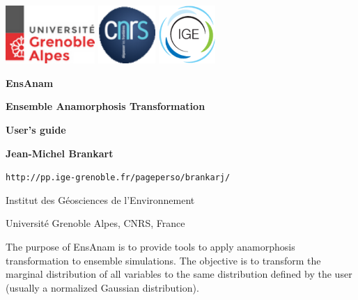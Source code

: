 \documentclass[11pt]{article}
\begin{document}
\pagestyle{empty}

\centerline{
\includegraphics[height=22mm]{Logos/logo_uga.png}
\hspace{5mm}
\includegraphics[height=22mm]{Logos/logo_cnrs.png}
\hfill
\includegraphics[height=22mm]{Logos/logo_ige.png}
}

\vspace{20mm}

\begin{center}

{\Huge\bf EnsAnam}

\vspace{10mm}
{\Large\bf Ensemble Anamorphosis Transformation}

\vspace{10mm}
{\Large\bf User's guide}

\vspace{10mm}
{\large\bf Jean-Michel Brankart}

\vspace{5mm}
{\tt http://pp.ige-grenoble.fr/pageperso/brankarj/}

\vspace{5mm}
{\large Institut des G\'eosciences de l'Environnement}

\vspace{1mm}
{\large Universit\'e Grenoble Alpes, CNRS, France}

\end{center}

\vspace{20mm}
The purpose of EnsAnam is to provide tools
to apply anamorphosis transformation to ensemble simulations.
The objective is to transform the marginal distribution of all variables
to the same distribution defined by the user
(usually a normalized Gaussian distribution).
\end{document}
